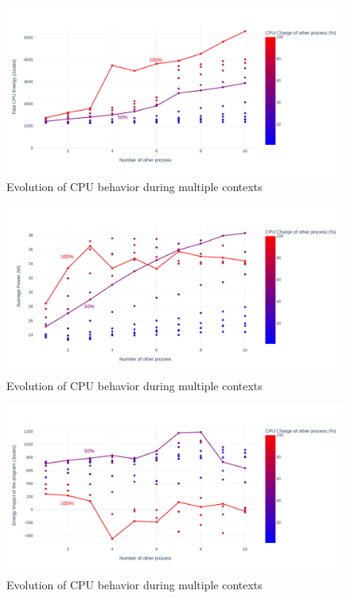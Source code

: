 \begin{figure}[!h]
      \centering
      \caption{Evolution of CPU behavior during multiple contexts }
      \label{fig:green_faas}
      \includegraphics[width=\linewidth]{chapters/green_faas_energy}
\end{figure}

\begin{figure}[!h]
      \centering
      \caption{Evolution of CPU behavior during multiple contexts }
      \label{fig:green_faas}
      \includegraphics[width=\linewidth]{chapters/green_faas_power}
\end{figure}

\begin{figure}[!h]
      \centering
      \caption{Evolution of CPU behavior during multiple contexts }
      \label{fig:green_faas}
      \includegraphics[width=\linewidth]{chapters/green_faas_impact}
\end{figure}


